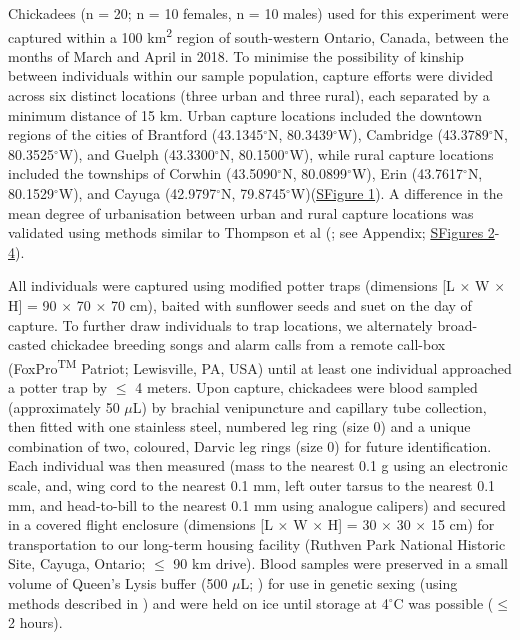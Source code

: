 \documentclass[12pt]{article}
\begin{document}
\noindent Chickadees (n = 20; n = 10 females, n = 10 males) used for this experiment were captured within a 100 km\textsuperscript{2} region of south-western Ontario, Canada, between the months of March and April in 2018. To minimise the possibility of kinship between individuals within our sample population, capture efforts were divided across six distinct locations (three urban and three rural), each separated by a minimum distance of 15 km. Urban capture locations included the downtown regions of the cities of Brantford (43.1345$^{\circ}$N, 80.3439$^{\circ}$W), Cambridge (43.3789$^{\circ}$N, 80.3525$^{\circ}$W), and Guelph (43.3300$^{\circ}$N, 80.1500$^{\circ}$W), while rural capture locations included the townships of Corwhin (43.5090$^{\circ}$N, 80.0899$^{\circ}$W), Erin (43.7617$^{\circ}$N, 80.1529$^{\circ}$W), and Cayuga (42.9797$^{\circ}$N, 79.8745$^{\circ}$W)(\hyperref[FigC.1]{SFigure 1}). A difference in the mean degree of urbanisation between urban and rural capture locations was validated using methods similar to Thompson et al (\citeyear{thompson_2018}; see Appendix; \hyperref[FigC.2]{SFigures 2}-\hyperref[FigC.4]{4}). \vspace{1cm}

\noindent All individuals were captured using modified potter traps (dimensions [L $\times$ W $\times$ H] = 90 $\times$ 70 $\times$ 70 cm), baited with sunflower seeds and suet on the day of capture. To further draw individuals to trap locations, we alternately broad-casted chickadee breeding songs and alarm calls from a remote call-box (FoxPro\textsuperscript{TM} Patriot; Lewisville, PA, USA) until at least one individual approached a potter trap by $\leq$ 4 meters. Upon capture, chickadees were blood sampled (approximately 50 $\mu$L) by brachial venipuncture and capillary tube collection, then fitted with one stainless steel, numbered leg ring (size 0) and a unique combination of two, coloured, Darvic leg rings (size 0) for future identification. Each individual was then measured (mass to the nearest 0.1 g using an electronic scale, and, wing cord to the nearest 0.1 mm, left outer tarsus to the nearest 0.1 mm, and head-to-bill to the nearest 0.1 mm using analogue calipers) and secured in a covered flight enclosure (dimensions [L $\times$ W $\times$ H] = 30 $\times$ 30 $\times$ 15 cm) for transportation to our long-term housing facility (Ruthven Park National Historic Site, Cayuga, Ontario; $\leq$ 90 km drive). Blood samples were preserved in a small volume of Queen's Lysis buffer (500 $\mu$L; \citealt{seutin_1991}) for use in genetic sexing (using methods described in \citealt{robertson_2020a}) and were held on ice until storage at 4$^{\circ}$C was possible ($\leq$ 2 hours). \vspace{1cm}
\end{document}
